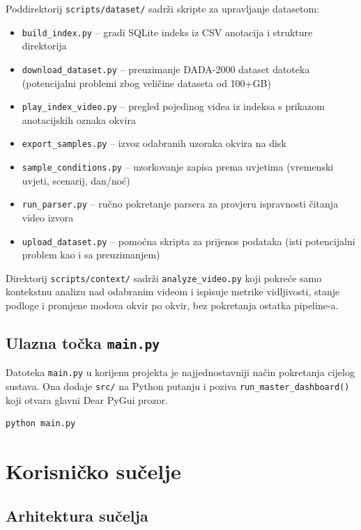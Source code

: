 Poddirektorij \texttt{scripts/dataset/} sadrži skripte za upravljanje datasetom:
\begin{itemize}
    \item \texttt{build\_index.py} -- gradi SQLite indeks iz CSV anotacija i strukture direktorija
    \item \texttt{download\_dataset.py} -- preuzimanje DADA-2000 dataset datoteka (potencijalni problemi zbog veličine dataseta od 100+GB)
    \item \texttt{play\_index\_video.py} -- pregled pojedinog videa iz indeksa s prikazom anotacijskih oznaka okvira
    \item \texttt{export\_samples.py} -- izvoz odabranih uzoraka okvira na disk
    \item \texttt{sample\_conditions.py} -- uzorkovanje zapisa prema uvjetima (vremenski uvjeti, scenarij, dan/noć)
    \item \texttt{run\_parser.py} -- ručno pokretanje parsera za provjeru ispravnosti čitanja video izvora
    \item \texttt{upload\_dataset.py} -- pomoćna skripta za prijenos podataka (isti potencijalni problem kao i sa preuzimanjem)
\end{itemize}

Direktorij \texttt{scripts/context/} sadrži \texttt{analyze\_video.py} koji pokreće samo kontekstnu analizu nad odabranim videom i ispisuje metrike vidljivosti, stanje podloge i promjene modova okvir po okvir, bez pokretanja ostatka pipeline-a.

\subsection{Ulazna točka \texttt{main.py}}

Datoteka \texttt{main.py} u korijenu projekta je najjednostavniji način pokretanja cijelog sustava. Ona dodaje \texttt{src/} na Python putanju i poziva \texttt{run\_master\_dashboard()} koji otvara glavni Dear PyGui prozor.

\begin{lstlisting}[style=bashcode, caption={Pokretanje glavnog sučelja}, label={lst:main}]
python main.py
\end{lstlisting}

\section{Korisničko sučelje}

\subsection{Arhitektura sučelja}


